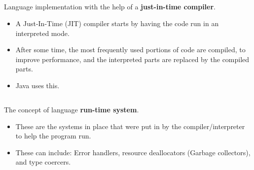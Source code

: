 \subsection{}
Language implementation with the help of a \textbf{just-in-time compiler}.

\begin{itemize}[noitemsep]
\item A Just-In-Time (JIT) compiler starts by having the code run in an interpreted mode.
\item After some time, the most frequently used portions of code are compiled, to improve performance, and the interpreted parts are replaced by the compiled parts.
\item Java uses this.
\end{itemize}

\subsection{}
The concept of language \textbf{run-time system}.

\begin{itemize}[noitemsep]
\item These are the systems in place that were put in by the compiler/interpreter to help the program run.
\item These can include: Error handlers, resource deallocators (Garbage collectors), and type coercers.
\end{itemize}

